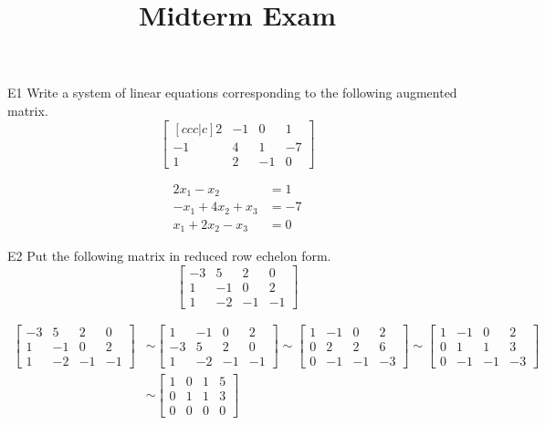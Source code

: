 \documentclass{sbgLAexam}
\title{Midterm Exam}
\begin{document}
\begin{problem}{E1}
Write a system of linear equations corresponding to the following
augmented matrix.
\[
\begin{bmatrix}[ccc|c]
2 & -1 & 0 & 1  \\
-1 & 4 & 1 & -7  \\
1 & 2 & -1 & 0
\end{bmatrix}
\]
\end{problem}
\begin{solution}
\begin{align*}
2x_1-x_2&=1 \\
-x_1+4x_2+x_3&=-7 \\
x_1+2x_2-x_3 &= 0
\end{align*}
\end{solution}

\begin{problem}{E2}
Put the following matrix in reduced row echelon form.
$$\begin{bmatrix}-3 & 5 & 2 & 0 \\ 1 & -1 & 0 & 2 \\ 1 & -2 & -1 & -1 \end{bmatrix}$$
\end{problem}
\begin{solution}
\begin{align*}
\begin{bmatrix}
-3 & 5 & 2 & 0 \\
 1 & -1 & 0 & 2 \\
 1 & -2 & -1 & -1
\end{bmatrix} &\sim
\begin{bmatrix}
 1 & -1 & 0 & 2 \\
-3 & 5 & 2 & 0 \\
 1 & -2 & -1 & -1
\end{bmatrix} \sim
\begin{bmatrix}
 1 & -1 & 0 & 2 \\
 0 & 2 & 2 & 6 \\
 0 & -1 & -1 & -3
\end{bmatrix} \sim
\begin{bmatrix}
 1 & -1 & 0 & 2 \\
 0 & 1 & 1 & 3 \\
 0 & -1 & -1 & -3
\end{bmatrix} \\ &\sim
\begin{bmatrix}
 1 & 0 & 1 & 5 \\
 0 & 1 & 1 & 3 \\
 0 & 0 & 0 & 0
\end{bmatrix}
\end{align*}
\end{solution}
\end{document}
